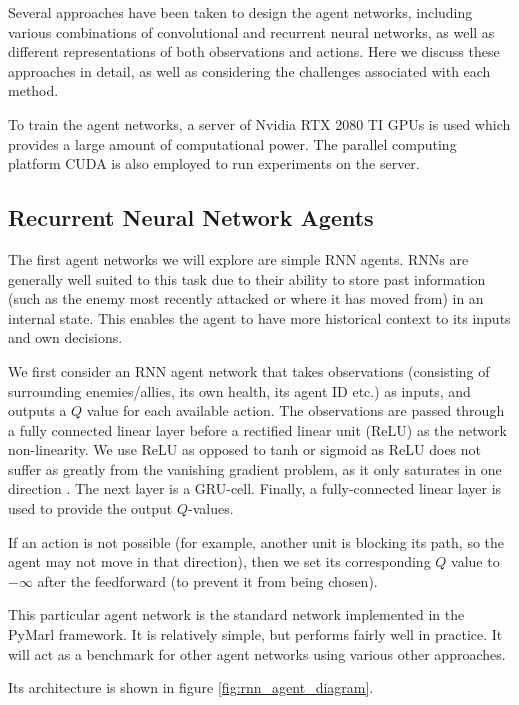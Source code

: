 Several approaches have been taken to design the agent networks, including various combinations of convolutional and recurrent neural networks, as well as different representations of both observations and actions. Here we discuss these approaches in detail, as well as considering the challenges associated with each method.



To train the agent networks, a server of Nvidia RTX 2080 TI GPUs is used which provides a large amount of computational power. The parallel computing platform CUDA \cite{cuda} is also employed to run experiments on the server.




\subsection{Recurrent Neural Network Agents}


The first agent networks we will explore are simple RNN agents. RNNs are generally well suited to this task due to their ability to store past information (such as the enemy most recently attacked or where it has moved from) in an internal state. This enables the agent to have more historical context to its inputs and own decisions.

We first consider an RNN agent network that takes observations (consisting of surrounding enemies/allies, its own health, its agent ID etc.) as inputs, and outputs a $Q$ value for each available action. The observations are passed through a fully connected linear layer before a rectified linear unit (ReLU) as the network non-linearity. We use ReLU as opposed to tanh or sigmoid as ReLU does not suffer as greatly from the vanishing gradient problem, as it only saturates in one direction \cite{relu}. The next layer is a GRU-cell. Finally, a fully-connected linear layer is used to provide the output $Q$-values.

If an action is not possible (for example, another unit is blocking its path, so the agent may not move in that direction), then we set its corresponding $Q$ value to $-\infty$ after the feedforward (to prevent it from being chosen).

This particular agent network is the standard network implemented in the PyMarl framework. It is relatively simple, but performs fairly well in practice. It will act as a benchmark for other agent networks using various other approaches.

Its architecture is shown in figure \ref{fig:rnn_agent_diagram}.


